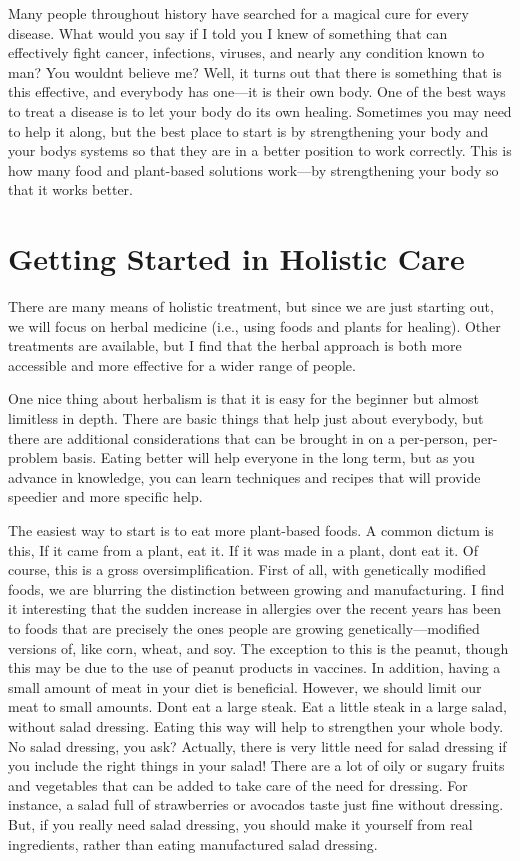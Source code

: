 Many people throughout history have searched for a magical cure for
every disease. What would you say if I told you I knew of something
that can effectively
fight cancer, infections, viruses, and nearly any condition
known to man?  You
wouldn{\textquotesingle}t believe me?  Well, it turns out that there is
something that is this effective, and everybody has one—it is their own
body. One of the best
ways to treat a
disease is to let
your body do its own healing. Sometimes you may need to help it along,
but the best place to start is by strengthening your body and your
body{\textquotesingle}s systems so that they are in a better position
to work correctly. This is how many food and plant-based solutions
work—by strengthening your body so that it works better.

\section{Getting Started in Holistic Care}

There are many means of holistic treatment,
but since we are just
starting out, we will focus on herbal medicine
(i.e., using foods
and plants for
healing). Other
treatments are available, but I find that the herbal approach is both
more accessible and more effective for a wider
range of people.


One nice thing about herbalism is that it is easy for the beginner but
almost limitless in depth. There are basic things that help just about
everybody, but there are additional considerations that can be brought
in on a per-person, per-problem basis. Eating better will help everyone
in the long term, but as you advance in knowledge, you can learn
techniques and recipes that will provide speedier and more specific
help. 


The easiest way to start is to eat more plant-based foods. A common
dictum is this, {\textquotedbl}If it came from a plant, eat it. If it
was made in a plant, don{\textquotesingle}t eat it.{\textquotedbl}  Of
course, this is a gross oversimplification. First of all, with
genetically modified foods, we are blurring the distinction between
growing and manufacturing. I find it interesting that the sudden
increase in allergies over the recent years has been to foods that are
precisely the ones people are growing genetically—modified versions of,
like corn, wheat, and soy. The exception to this is the peanut, though
this may be due to the use of peanut products in vaccines. In addition,
having a small amount of meat in your diet is beneficial. However, we
should limit our meat to small amounts. Don{\textquotesingle}t eat a
large steak. Eat a little steak in a large salad, without salad
dressing. Eating this way will help to strengthen your whole body.  No
salad dressing, you ask?  Actually, there is very little need for salad
dressing if you include the right things in your salad!  There are a
lot of oily or sugary fruits and vegetables that can be added to take
care of the need for dressing.  For instance, a salad full of
strawberries or avocados taste just fine without dressing.  But, if you
really need salad dressing, you should make it yourself from real
ingredients, rather than eating manufactured salad dressing.


